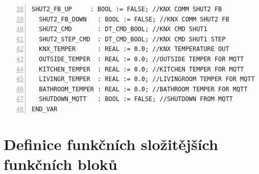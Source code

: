 \begin{lstlisting}[language=ST, breaklines=true, numbers=left, firstnumber=38, numberstyle=\small, numbersep=10pt, frame=single, basicstyle=\ttfamily\small]
  SHUT2_FB_UP     : BOOL := FALSE; //KNX COMM SHUT2 FB
  SHUT2_FB_DOWN   : BOOL := FALSE; //KNX COMM SHUT2 FB
  SHUT2_CMD       : DT_CMD_BOOL; //KNX CMD SHUT1
  SHUT2_STEP_CMD  : DT_CMD_BOOL; //KNX CMD SHUT1 STEP
  KNX_TEMPER      : REAL := 0.0; //KNX TEMPERATURE OUT
  OUTSIDE_TEMPER  : REAL := 0.0; //OUTSIDE TEMPER FOR MQTT
  KITCHEN_TEMPER  : REAL := 0.0; //KITCHEN TEMPER FOR MQTT
  LIVINGR_TEMPER  : REAL := 0.0; //LIVINGROOM TEMPER FOR MQTT
  BATHROOM_TEMPER : REAL := 0.0; //BATHROOM TEMPER FOR MQTT
  SHUTDOWN_MQTT   : BOOL := FALSE; //SHUTDOWN FROM MQTT
END_VAR
\end{lstlisting}
\chapter{Definice funkčních složitějších funkčních bloků}
\label{apend:fb}
